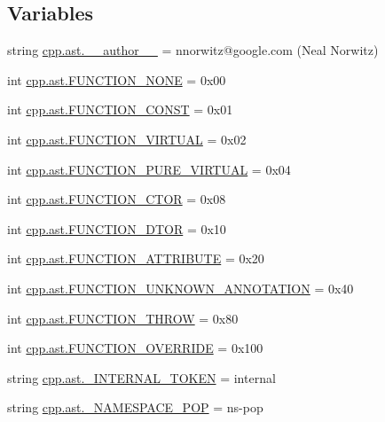\subsection*{Variables}
\begin{DoxyCompactItemize}
\item 
string \mbox{\hyperlink{namespacecpp_1_1ast_aa0742cad7ac7285ad26b163812fc1b94}{cpp.\+ast.\+\_\+\+\_\+author\+\_\+\+\_\+}} = \textquotesingle{}nnorwitz@google.\+com (Neal Norwitz)\textquotesingle{}
\item 
int \mbox{\hyperlink{namespacecpp_1_1ast_a8f1229df8e1348664a7e6142c2d0ae0b}{cpp.\+ast.\+F\+U\+N\+C\+T\+I\+O\+N\+\_\+\+N\+O\+NE}} = 0x00
\item 
int \mbox{\hyperlink{namespacecpp_1_1ast_a73fe57808e7f2e3f3e9d0e1088f183be}{cpp.\+ast.\+F\+U\+N\+C\+T\+I\+O\+N\+\_\+\+C\+O\+N\+ST}} = 0x01
\item 
int \mbox{\hyperlink{namespacecpp_1_1ast_a7d444baf6763d374aa4ef9c3f0e6d5b3}{cpp.\+ast.\+F\+U\+N\+C\+T\+I\+O\+N\+\_\+\+V\+I\+R\+T\+U\+AL}} = 0x02
\item 
int \mbox{\hyperlink{namespacecpp_1_1ast_ae8f597c9a3e49e1a29e8da1848d40ff1}{cpp.\+ast.\+F\+U\+N\+C\+T\+I\+O\+N\+\_\+\+P\+U\+R\+E\+\_\+\+V\+I\+R\+T\+U\+AL}} = 0x04
\item 
int \mbox{\hyperlink{namespacecpp_1_1ast_ae380e31bf1bce9757f3289a704715c2d}{cpp.\+ast.\+F\+U\+N\+C\+T\+I\+O\+N\+\_\+\+C\+T\+OR}} = 0x08
\item 
int \mbox{\hyperlink{namespacecpp_1_1ast_a4491e62237a2689be078bf3b455549e6}{cpp.\+ast.\+F\+U\+N\+C\+T\+I\+O\+N\+\_\+\+D\+T\+OR}} = 0x10
\item 
int \mbox{\hyperlink{namespacecpp_1_1ast_a6462424cd2b9884f63bf7594811321cd}{cpp.\+ast.\+F\+U\+N\+C\+T\+I\+O\+N\+\_\+\+A\+T\+T\+R\+I\+B\+U\+TE}} = 0x20
\item 
int \mbox{\hyperlink{namespacecpp_1_1ast_a9d3ba548a6c733892e60c8accdc96639}{cpp.\+ast.\+F\+U\+N\+C\+T\+I\+O\+N\+\_\+\+U\+N\+K\+N\+O\+W\+N\+\_\+\+A\+N\+N\+O\+T\+A\+T\+I\+ON}} = 0x40
\item 
int \mbox{\hyperlink{namespacecpp_1_1ast_a3384f360da38e3df526d189238118fb5}{cpp.\+ast.\+F\+U\+N\+C\+T\+I\+O\+N\+\_\+\+T\+H\+R\+OW}} = 0x80
\item 
int \mbox{\hyperlink{namespacecpp_1_1ast_aecf2f8a17fb10fe367d2da84849c06c9}{cpp.\+ast.\+F\+U\+N\+C\+T\+I\+O\+N\+\_\+\+O\+V\+E\+R\+R\+I\+DE}} = 0x100
\item 
string \mbox{\hyperlink{namespacecpp_1_1ast_aea75be79d23641b8d6b405544181cbed}{cpp.\+ast.\+\_\+\+I\+N\+T\+E\+R\+N\+A\+L\+\_\+\+T\+O\+K\+EN}} = \textquotesingle{}internal\textquotesingle{}
\item 
string \mbox{\hyperlink{namespacecpp_1_1ast_a35d68f08f8c54c2e22a1757e3899eb59}{cpp.\+ast.\+\_\+\+N\+A\+M\+E\+S\+P\+A\+C\+E\+\_\+\+P\+OP}} = \textquotesingle{}ns-\/pop\textquotesingle{}
\end{DoxyCompactItemize}
